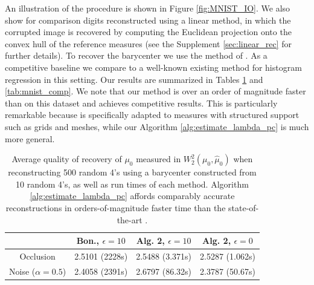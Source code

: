 \documentclass[nohyperref]{article}
\theoremstyle{definition}
\begin{document}
An illustration of the procedure is shown in Figure \ref{fig:MNIST_IO}.  We also show for comparison digits reconstructed using a linear method, in which the corrupted image is recovered by computing the Euclidean projection onto the convex hull of the reference measures (see the Supplement \ref{sec:linear_rec} for further details). To recover the barycenter we use the method of \cite{benamou2015iterative}. As a competitive baseline we compare to a well-known existing method for histogram regression \cite{bonneel2016coordinates} in this setting. Our results are summarized in Tables \ref{tab:mnist} and \ref{tab:mnist_comp}. We note that our method is over an order of magnitude faster than \cite{bonneel2016coordinates} on this dataset and achieves competitive results.  This is particularly remarkable because \cite{bonneel2016coordinates} is specifically adapted to measures with structured support such as grids and meshes, while our Algorithm \ref{alg:estimate_lambda_pc} is much more general. 
\begin{table}[]
\centering
\begin{tabular}{c|c|c|c|}
\cline{2-4}
    & Bon., $\epsilon = 10$ & Alg. 2, $\epsilon = 10$ & Alg. 2, $\epsilon = 0$ \\ 
    \hline
    \multicolumn{1}{|c|}{Occlusion}  & 2.5101 (2228s)  & 2.5488 (3.371s) & 2.5287 (1.062s) \\ 
    \hline
    \multicolumn{1}{|c|}{Noise ($\alpha=0.5$)} & 2.4058 (2391s) & 2.6797 (86.32s) & 2.3787 (50.67s) \\ 
    \hline
\end{tabular}
\caption{Average quality of recovery of $\mu_0$ measured in $W_2^2(\mu_0, \hat{\mu}_0)$ when reconstructing 500 random 4's using a barycenter constructed from 10 random 4's, as well as run times of each method.  Algorithm \ref{alg:estimate_lambda_pc} affords comparably accurate reconstructions in orders-of-magnitude faster time than the state-of-the-art \cite{bonneel2016coordinates}\label{tab:mnist}.}
\end{table}
\end{document}
